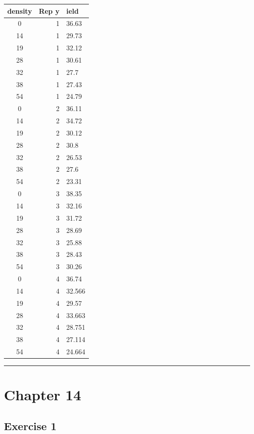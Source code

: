 \documentclass[a4paper,12pt,oneside]{book}
\begin{document}
\begin{longtable}[]{@{}crl@{}}
\toprule
density & Rep y & ield \\
\midrule
\endhead
0 & 1 & 36.63 \\
14 & 1 & 29.73 \\
19 & 1 & 32.12 \\
28 & 1 & 30.61 \\
32 & 1 & 27.7 \\
38 & 1 & 27.43 \\
54 & 1 & 24.79 \\
0 & 2 & 36.11 \\
14 & 2 & 34.72 \\
19 & 2 & 30.12 \\
28 & 2 & 30.8 \\
32 & 2 & 26.53 \\
38 & 2 & 27.6 \\
54 & 2 & 23.31 \\
0 & 3 & 38.35 \\
14 & 3 & 32.16 \\
19 & 3 & 31.72 \\
28 & 3 & 28.69 \\
32 & 3 & 25.88 \\
38 & 3 & 28.43 \\
54 & 3 & 30.26 \\
0 & 4 & 36.74 \\
14 & 4 & 32.566 \\
19 & 4 & 29.57 \\
28 & 4 & 33.663 \\
32 & 4 & 28.751 \\
38 & 4 & 27.114 \\
54 & 4 & 24.664 \\
\bottomrule
\end{longtable}

\begin{center}\rule{0.5\linewidth}{0.5pt}\end{center}

\hypertarget{chapter-14}{%
\section{Chapter 14}\label{chapter-14}}

\hypertarget{exercise-1-8}{%
\subsection{Exercise 1}\label{exercise-1-8}}
\end{document}
